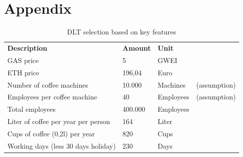 \documentclass[conference]{IEEEtran}
\begin{document}
\newpage

\section*{Appendix}
\label{appendix}

\begin{table}[!htbp]
\centering
\caption{DLT selection based on key features}
\begin{tabular}{llll}
\textbf{Description}                         & \textbf{Amount}     & \textbf{Unit}                                                 & \textbf{}                                                           \\
GAS price                                    & 5                   & GWEI                                                          &                                                                     \\
ETH price                                    & 196,04              & Euro                                                          &                                                                     \\
Number of coffee machines                    & 10.000              & Machines                                                      & (assumption)                                                        \\
Employees per coffee machine                 & 40                  & Employees                                                     & (assumption)                                                        \\
Total employees                              & 400.000             & Employees                                                     &                                                                     \\
Liter of coffee per year per person          & 164                 & Liter                                                         &                                                                     \\
Cups of coffee (0,2l) per year               & 820                 & Cups                                                          &                                                                     \\
Working days (less 30 days holiday)          & 230                 & Days                                                          &                                                                     \\

\end{tabular}
\end{table}
\end{document}
